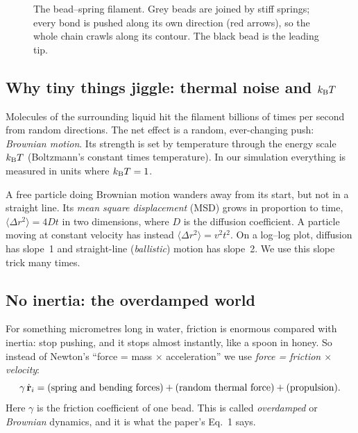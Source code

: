 \documentclass[11pt]{article}
\begin{document}
\begin{figure}[H]\centering
{}
\caption{The bead--spring filament. Grey beads are joined by stiff springs; every bond is pushed along its own direction (red arrows), so the whole chain crawls along its contour. The black bead is the leading tip.}
\label{fig:beads}
\end{figure}

\subsection{Why tiny things jiggle: thermal noise and $k_{\mathrm{B}}T$}
Molecules of the surrounding liquid hit the filament billions of times per second from random directions. The net effect is a random, ever-changing push: \emph{Brownian motion}.
Its strength is set by temperature through the energy scale $k_{\mathrm{B}}T$ (Boltzmann's constant times temperature). In our simulation everything is measured in units where $k_{\mathrm{B}}T=1$.

A free particle doing Brownian motion wanders away from its start, but not in a straight line. Its \emph{mean square displacement} (MSD) grows in proportion to time,
$\langle\Delta r^2\rangle=4Dt$ in two dimensions, where $D$ is the diffusion coefficient. A particle moving at constant velocity has instead $\langle\Delta r^2\rangle=v^2t^2$.
On a log--log plot, diffusion has slope~1 and straight-line (\emph{ballistic}) motion has slope~2. We use this slope trick many times.

\subsection{No inertia: the overdamped world}
For something micrometres long in water, friction is enormous compared with inertia: stop pushing, and it stops almost instantly, like a spoon in honey.
So instead of Newton's ``force = mass $\times$ acceleration'' we use \emph{force = friction $\times$ velocity}:
\begin{equation}
\gamma\,\dot{\mathbf{r}}_i = \text{(spring and bending forces)} + \text{(random thermal force)} + \text{(propulsion)} .
\end{equation}
Here $\gamma$ is the friction coefficient of one bead. This is called \emph{overdamped} or \emph{Brownian} dynamics, and it is what the paper's Eq.~1 says.
\end{document}
